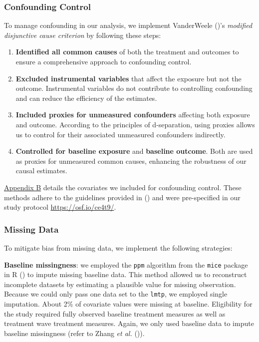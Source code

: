 \documentclass[
  single column]{article}
\providecommand{\tightlist}{%
  \setlength{\itemsep}{0pt}\setlength{\parskip}{0pt}}\usepackage{longtable,booktabs,array}
\begin{document}
\subsubsection{Confounding Control}\label{confounding-control}

To manage confounding in our analysis, we implement VanderWeele
()'s \emph{modified disjunctive
cause criterion} by following these steps:

\begin{enumerate}
\def\labelenumi{\arabic{enumi}.}
\tightlist
\item
  \textbf{Identified all common causes} of both the treatment and
  outcomes to ensure a comprehensive approach to confounding control.
\item
  \textbf{Excluded instrumental variables} that affect the exposure but
  not the outcome. Instrumental variables do not contribute to
  controlling confounding and can reduce the efficiency of the
  estimates.
\item
  \textbf{Included proxies for unmeasured confounders} affecting both
  exposure and outcome. According to the principles of d-separation,
  using proxies allows us to control for their associated unmeasured
  confounders indirectly.
\item
  \textbf{Controlled for baseline exposure} and \textbf{baseline
  outcome}. Both are used as proxies for unmeasured common causes,
  enhancing the robustness of our causal estimates.
\end{enumerate}

\hyperref[appendix-demographics]{Appendix B} details the covariates we
included for confounding control. These methods adhere to the guidelines
provided in () and
were pre-specified in our study protocol \url{https://osf.io/ce4t9/}.

\subsubsection{Missing Data}\label{missing-data}

To mitigate bias from missing data, we implement the following
strategies:

\textbf{Baseline missingness}: we employed the \texttt{ppm} algorithm
from the \texttt{mice} package in R () to impute missing baseline data. This method allowed us to
reconstruct incomplete datasets by estimating a plausible value for
missing observation. Because we could only pass one data set to the
\texttt{lmtp}, we employed single imputation. About 2\% of covariate
values were missing at baseline. Eligibility for the study required
fully observed baseline treatment measures as well as treatment wave
treatment measures. Again, we only used baseline data to impute baseline
missingness (refer to Zhang \emph{et al.}
()).
\end{document}
